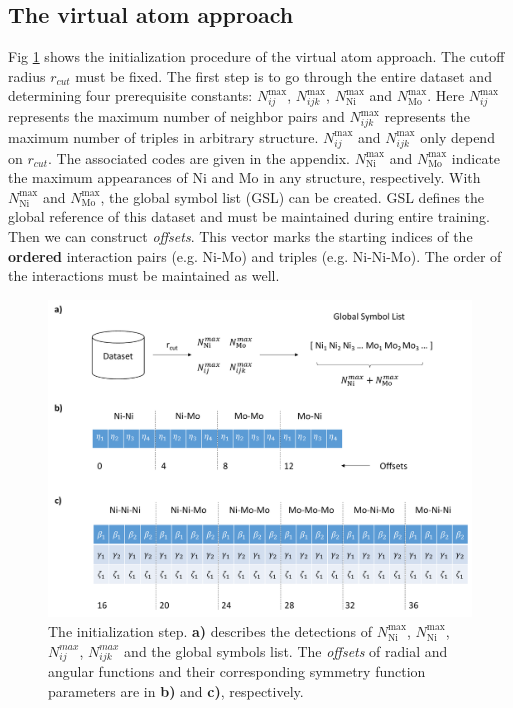 \documentclass[preprint]{revtex4-2}
\begin{document}
\subsection{The virtual atom approach}
\label{section:virtual_atom_approach}

Fig \ref{fig:algo1} shows the initialization procedure of the virtual atom 
approach. The cutoff radius $r_{cut}$ must be fixed. The first step is to go 
through the entire dataset and determining four prerequisite constants: 
$N_{ij}^{\mathrm{max}}$, $N_{ijk}^{\mathrm{max}}$, 
$N_{\mathrm{Ni}}^{\mathrm{max}}$ and $N_{\mathrm{Mo}}^{\mathrm{max}}$. 
Here $N_{ij}^{\mathrm{max}}$ represents the maximum number of neighbor pairs 
and $N_{ijk}^{\mathrm{max}}$ represents the maximum number of triples in 
arbitrary structure. 
$N_{ij}^{\mathrm{max}}$ and $N_{ijk}^{\mathrm{max}}$ only depend on 
$r_{cut}$. The associated codes are given in the appendix.
$N_{\mathrm{Ni}}^{\mathrm{max}}$ and $N_{\mathrm{Mo}}^{\mathrm{max}}$ indicate 
the maximum appearances of Ni and Mo in any structure, respectively. 
With $N_{\mathrm{Ni}}^{\mathrm{max}}$ and $N_{\mathrm{Mo}}^{\mathrm{max}}$, 
the global symbol list (GSL) can be created. GSL defines the global reference 
of this dataset and must be maintained during entire training. Then we can 
construct \textit{offsets}. This vector marks the starting indices of the 
\textbf{ordered} interaction pairs (e.g. Ni-Mo) and triples (e.g. Ni-Ni-Mo). 
The order of the interactions must be maintained as well.

\begin{figure}[h!]
\centering
\includegraphics[scale=0.5]{figures/Fig1-prepare.pdf}
\caption{\label{fig:algo1} The initialization step. 
\textbf{a)} describes the detections of $N_{\mathrm{Ni}}^{\mathrm{max}}$, 
$N_{\mathrm{Ni}}^{\mathrm{max}}$, $N_{ij}^{max}$, $N_{ijk}^{max}$ and the global
symbols list.
The \textit{offsets} of radial and angular functions and their corresponding 
symmetry function parameters are in \textbf{b)} and \textbf{c)}, respectively.
}
\end{figure}
\end{document}
